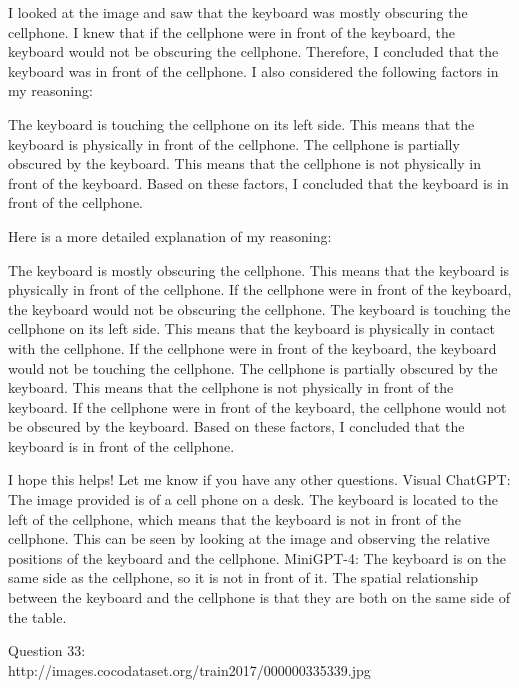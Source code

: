 \begin{enumerate}
        I looked at the image and saw that the keyboard was mostly obscuring the cellphone.
        I knew that if the cellphone were in front of the keyboard, the keyboard would not be obscuring the cellphone.
        Therefore, I concluded that the keyboard was in front of the cellphone.
        I also considered the following factors in my reasoning:
        
        The keyboard is touching the cellphone on its left side. This means that the keyboard is physically in front of the cellphone.
        The cellphone is partially obscured by the keyboard. This means that the cellphone is not physically in front of the keyboard.
        Based on these factors, I concluded that the keyboard is in front of the cellphone.
        
        Here is a more detailed explanation of my reasoning:
        
        The keyboard is mostly obscuring the cellphone. This means that the keyboard is physically in front of the cellphone. If the cellphone were in front of the keyboard, the keyboard would not be obscuring the cellphone.
        The keyboard is touching the cellphone on its left side. This means that the keyboard is physically in contact with the cellphone. If the cellphone were in front of the keyboard, the keyboard would not be touching the cellphone.
        The cellphone is partially obscured by the keyboard. This means that the cellphone is not physically in front of the keyboard. If the cellphone were in front of the keyboard, the cellphone would not be obscured by the keyboard.
        Based on these factors, I concluded that the keyboard is in front of the cellphone.
        
        I hope this helps! Let me know if you have any other questions.
        \subitem Visual ChatGPT: The image provided is of a cell phone on a desk. The keyboard is located to the left of the cellphone, which means that the keyboard is not in front of the cellphone. This can be seen by looking at the image and observing the relative positions of the keyboard and the cellphone.
        \subitem MiniGPT-4: The keyboard is on the same side as the cellphone, so it is not in front of it. The spatial relationship between the keyboard and the cellphone is that they are both on the same side of the table.
    \end{enumerate}
Question 33:\\http://images.cocodataset.org/train2017/000000335339.jpg
